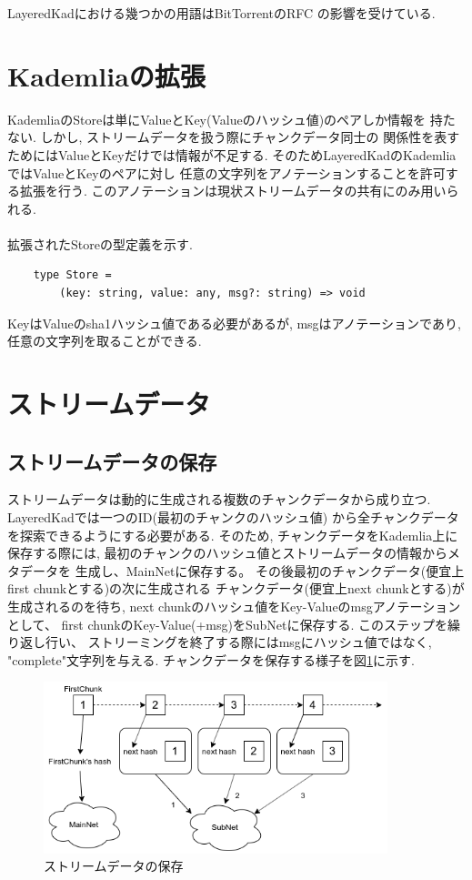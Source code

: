 \documentclass[sotsuron]{jcsie}
\begin{document}
LayeredKadにおける幾つかの用語はBitTorrentのRFC\cite{bep0000r38:online}
の影響を受けている.

\section{Kademliaの拡張}
KademliaのStoreは単にValueとKey(Valueのハッシュ値)のペアしか情報を
持たない.
しかし, ストリームデータを扱う際にチャンクデータ同士の
関係性を表すためにはValueとKeyだけでは情報が不足する.
そのためLayeredKadのKademliaではValueとKeyのペアに対し
任意の文字列をアノテーションすることを許可する拡張を行う.
このアノテーションは現状ストリームデータの共有にのみ用いられる.
\\\\
拡張されたStoreの型定義を示す.
\begin{lstlisting}
	type Store = 
		(key: string, value: any, msg?: string) => void
\end{lstlisting}
KeyはValueのsha1ハッシュ値である必要があるが, 
msgはアノテーションであり, 任意の文字列を取ることができる.

\section{ストリームデータ}
\subsection{ストリームデータの保存}
ストリームデータは動的に生成される複数のチャンクデータから成り立つ.
LayeredKadでは一つのID(最初のチャンクのハッシュ値)
から全チャンクデータを探索できるようにする必要がある.
そのため, チャンクデータをKademlia上に保存する際には, 
最初のチャンクのハッシュ値とストリームデータの情報からメタデータを
生成し、MainNetに保存する。
その後最初のチャンクデータ(便宜上first chunkとする)の次に生成される
チャンクデータ(便宜上next chunkとする)が生成されるのを待ち, 
next chunkのハッシュ値をKey-Valueのmsgアノテーションとして、
first chunkのKey-Value(+msg)をSubNetに保存する.
このステップを繰り返し行い、
ストリーミングを終了する際にはmsgにハッシュ値ではなく, 
"complete"文字列を与える.
チャンクデータを保存する様子を図\ref{fig:streamdata}に示す.
\begin{figure}[H]
	\centering
	\includegraphics[width=10cm]{./assets/image/stream.png}
	\caption{ストリームデータの保存}
	\label{fig:streamdata}
\end{figure}
\end{document}
